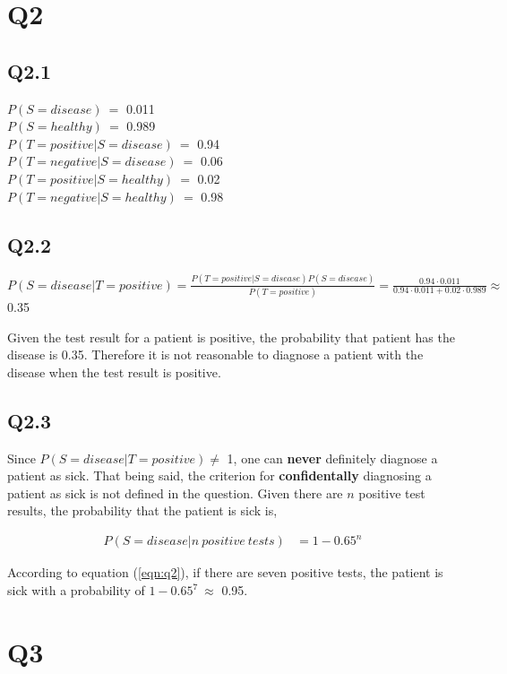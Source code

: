 \documentclass[12pt]{report}
\begin{document}
\section*{Q2}


\subsection*{Q2.1}

$P(S=disease)~=$ 0.011 \\
$P(S=healthy)~=$ 0.989 \\
$P(T=positive|S=disease)~=$ 0.94 \\
$P(T=negative|S=disease)~=$ 0.06 \\
$P(T=positive|S=healthy)~=$ 0.02 \\
$P(T=negative|S=healthy)~=$ 0.98 

\subsection*{Q2.2}

$P(S=disease|T=positive)=\frac{P(T=positive|S=disease) P(S=disease)}{P(T=positive)}=\frac{0.94 \cdot 0.011}{0.94 \cdot 0.011 + 0.02 \cdot 0.989} \approx$ 0.35

Given the test result for a patient is positive, the probability that patient has the disease is 0.35. Therefore it is not reasonable to diagnose a patient with the disease when the test result is positive.

\subsection*{Q2.3}

Since $P(S=disease|T=positive) \neq$ 1, one can \textbf{never} definitely diagnose a patient as sick. That being said, the criterion for \textbf{confidentally} diagnosing a patient as sick is not defined in the question. Given there are $n$ positive test results, the probability that the patient is sick is,

\begin{align} \label{eqn:q2}
P(S=disease|n~positive~tests) &= 1 - 0.65^n
\end{align}

According to equation (\ref{eqn:q2}), if there are seven positive tests, the patient is sick with a probability of $1 - 0.65^7~\approx$ 0.95.

\section*{Q3}
\end{document}
